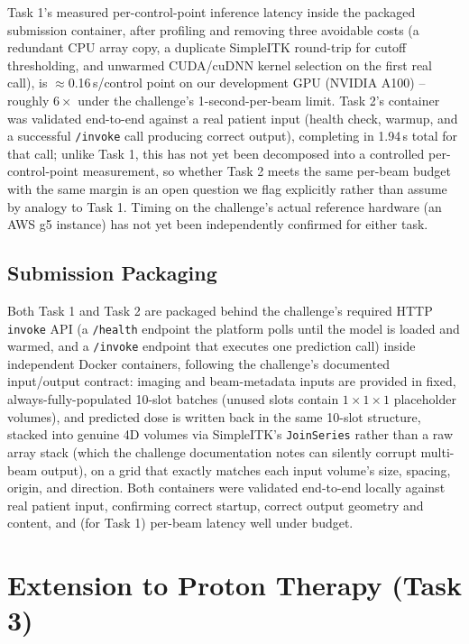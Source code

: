 \documentclass[10pt,conference]{IEEEtran}
\begin{document}
Task 1's measured per-control-point inference latency inside the
packaged submission container, after profiling and removing three
avoidable costs (a redundant CPU array copy, a duplicate SimpleITK
round-trip for cutoff thresholding, and unwarmed CUDA/cuDNN kernel
selection on the first real call), is $\approx$0.16\,s/control point on
our development GPU (NVIDIA A100) -- roughly $6\times$ under the
challenge's 1-second-per-beam limit. Task 2's container was validated
end-to-end against a real patient input (health check, warmup, and a
successful \texttt{/invoke} call producing correct output), completing
in 1.94\,s total for that call; unlike Task 1, this has not yet been
decomposed into a controlled per-control-point measurement, so whether
Task 2 meets the same per-beam budget with the same margin is an open
question we flag explicitly rather than assume by analogy to Task 1.
Timing on the challenge's actual reference hardware (an AWS g5 instance)
has not yet been independently confirmed for either task.

\subsection{Submission Packaging}

Both Task 1 and Task 2 are packaged behind the challenge's required HTTP
\texttt{invoke} API (a \texttt{/health} endpoint the platform polls
until the model is loaded and warmed, and a \texttt{/invoke} endpoint
that executes one prediction call) inside independent Docker containers,
following the challenge's documented input/output contract: imaging and
beam-metadata inputs are provided in fixed, always-fully-populated
10-slot batches (unused slots contain $1\times1\times1$ placeholder
volumes), and predicted dose is written back in the same 10-slot
structure, stacked into genuine 4D volumes via SimpleITK's
\texttt{JoinSeries} rather than a raw array stack (which the challenge
documentation notes can silently corrupt multi-beam output), on a grid
that exactly matches each input volume's size, spacing, origin, and
direction. Both containers were validated end-to-end locally against
real patient input, confirming correct startup, correct output geometry
and content, and (for Task 1) per-beam latency well under budget.

\section{Extension to Proton Therapy (Task 3)}
\end{document}
